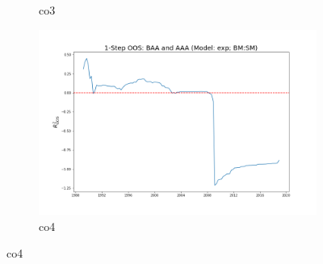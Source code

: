 \documentclass[a4paper,12pt,times,numbered,print,index]{report}
\numberwithin{equation}{section}
\begin{document}
\begin{figure}[!htbp]
\begin{subfigure}[b]{0.42\linewidth}
		\caption{co3}
	\end{subfigure}
	\begin{subfigure}[b]{0.42\linewidth}
		\includegraphics[width=0.9\linewidth]{OOS_plots/exp_co4_SM.png}
		\caption{co4}
	\end{subfigure}
	\label{g6}
\end{figure}
\end{document}
